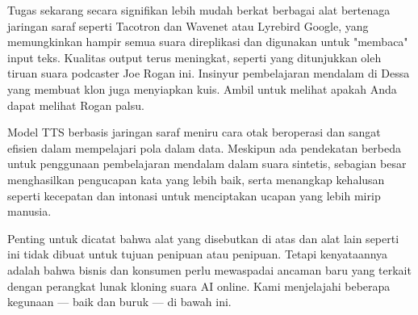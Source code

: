 Tugas sekarang secara signifikan lebih mudah berkat berbagai alat bertenaga jaringan saraf seperti Tacotron dan Wavenet atau Lyrebird Google, yang memungkinkan hampir semua suara direplikasi dan digunakan untuk "membaca" input teks. Kualitas output terus meningkat, seperti yang ditunjukkan oleh tiruan suara podcaster Joe Rogan ini. Insinyur pembelajaran mendalam di Dessa yang membuat klon juga menyiapkan kuis. Ambil untuk melihat apakah Anda dapat melihat Rogan palsu.

Model TTS berbasis jaringan saraf meniru cara otak beroperasi dan sangat efisien dalam mempelajari pola dalam data. Meskipun ada pendekatan berbeda untuk penggunaan pembelajaran mendalam dalam suara sintetis, sebagian besar menghasilkan pengucapan kata yang lebih baik, serta menangkap kehalusan seperti kecepatan dan intonasi untuk menciptakan ucapan yang lebih mirip manusia. 

Penting untuk dicatat bahwa alat yang disebutkan di atas dan alat lain seperti ini tidak dibuat untuk tujuan penipuan atau penipuan. Tetapi kenyataannya adalah bahwa bisnis dan konsumen perlu mewaspadai ancaman baru yang terkait dengan perangkat lunak kloning suara AI online. Kami menjelajahi beberapa kegunaan — baik dan buruk — di bawah ini. 

